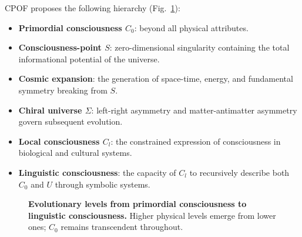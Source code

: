 \documentclass[11pt,a4paper]{article}
\begin{document}
CPOF proposes the following hierarchy (Fig.~\ref{fig:levels}):
\begin{itemize}
\item[L0] \textbf{Primordial consciousness $C_0$}: beyond all physical attributes.
\item[L1] \textbf{Consciousness-point $S$}: zero-dimensional singularity containing the total informational potential of the universe.
\item[L2] \textbf{Cosmic expansion}: the generation of space-time, energy, and fundamental symmetry breaking from $S$.
\item[L3] \textbf{Chiral universe $\Sigma$}: left-right asymmetry and matter-antimatter asymmetry govern subsequent evolution.
\item[L4] \textbf{Local consciousness $C_l$}: the constrained expression of consciousness in biological and cultural systems.
\item[L5] \textbf{Linguistic consciousness}: the capacity of $C_l$ to recursively describe both $C_0$ and $U$ through symbolic systems.
\end{itemize}

\begin{figure}[htbp]
\centering
{}
\caption{\textbf{Evolutionary levels from primordial consciousness to linguistic consciousness.} Higher physical levels emerge from lower ones; $C_0$ remains transcendent throughout.}
\label{fig:levels}
\end{figure}
\end{document}

